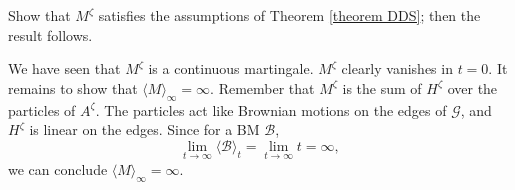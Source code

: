 \documentclass[11pt]{article}
\makeatletter
\renewenvironment{proof}[1][\proofname]{
   \par\pushQED{\qed}\normalfont
   \topsep6\p@\@plus6\p@\relax
   \trivlist\item[\hskip\labelsep\bfseries#1\@addpunct{.}]
   \ignorespaces
}{
   \popQED\endtrivlist\@endpefalse
}
\numberwithin{equation}{section}
\makeatother
\begin{document}
\begin{proof}[Proof of Lemma \ref{L: M as BM}]
  \renewcommand{\qedsymbol}{}
  Show that $M^{\zeta}$ satisfies the assumptions 
  of Theorem \ref{theorem DDS}; 
  then the result follows.

  We have seen that $M^{\zeta}$ is a continuous martingale. 
  $M^{\zeta}$ clearly vanishes in $t=0$.
  It remains to show that $\langle M \rangle _ {\infty} = \infty$.
  Remember that $M^{\zeta}$ is the sum of $H^{\zeta}$ over the  
  particles of $A^{\zeta}$. The particles
  act like Brownian motions on the edges of $\mathcal{G}$,   
  and $H^{\zeta}$ is linear on the edges.  
  Since for a BM $\mathcal{B}$,   
  \begin{equation}\nonumber
    \lim_{t \rightarrow \infty} \langle \mathcal{B} \rangle _t 
    = \lim_{t \rightarrow \infty} t = \infty,
  \end{equation}
  we can conclude $\langle M \rangle _ {\infty} = \infty$.
\end{proof}
\end{document}
